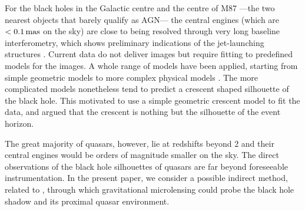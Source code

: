 \documentclass[usenatbib]{mn2e}
\begin{document}
For the black holes in the Galactic centre and the centre of M87
---the two nearest objects that barely qualify as AGN--- the central
engines (which are $<0.1\rm\,mas$ on the sky) are close to being
resolved through very long baseline interferometry, which shows
preliminary indications of the jet-launching structures
\citep{2008JPhCS.131a2055D,2012Sci...338..355D,2013MNRAS.434..765K,2016arXiv160205527F}.
Current data do not deliver images but require fitting to
predefined models for the images.  A whole range of models have been
applied, starting from simple geometric models to more complex
physical models
\citep{2008Natur.455...78D,2011ApJ...738...38B,2009ApJ...706..497M,2010ApJ...717.1092D}.
The more complicated models nonetheless tend to predict a crescent
shaped silhouette of the black hole.  This motivated
\cite{2013MNRAS.434..765K} to use a simple geometric crescent model to
fit the data, and argued that the crescent is nothing but the
silhouette of the event horizon.

The great majority of quasars, however, lie at redshifts beyond 2
\citep{2014A&A...563A..54P} and their central engines would be orders
of magnitude smaller on the sky. The direct observations of the black
hole silhouettes of quasars are far beyond foreseeable instrumentation.
In the present paper, we consider a possible indirect method, related
to \cite{1999ApJ...524...49A}, through which gravitational
microlensing could probe the black hole shadow and its proximal quasar
environment.
\end{document}
